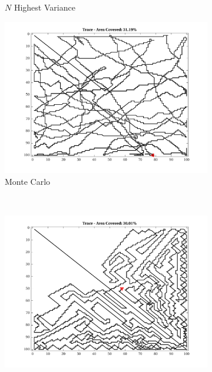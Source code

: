 \begin{figure}[htb!]
\begin{subfigure}[t]{0.3333\textwidth}
        \captionsetup{skip=0.20\baselineskip,size=footnotesize}
        \caption{$N$ Highest Variance}
    \end{subfigure}%
    \begin{subfigure}[t]{0.3333\textwidth}
        \centering
        \includegraphics[width=\linewidth]{figures/hbresults/path_mc_30p_100x100_sf_50_seed_2.png}
        \captionsetup{skip=0.20\baselineskip,size=footnotesize}
        \caption{Monte Carlo}
    \end{subfigure}%
    \\
    \begin{subfigure}[t]{0.3333\textwidth}
        \centering
        \includegraphics[width=\linewidth]{figures/hbresults/path_gradient_30p_100x100_sf_50_seed_2.png}

\end{subfigure}
\end{figure}
